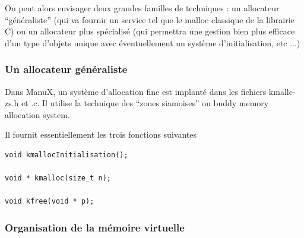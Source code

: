    On peut alors envisager deux grandes familles de techniques : un
allocateur ``généraliste''  (qui va fournir un service tel que le
malloc classique de la librairie C) ou un allocateur plus spécialisé
(qui permettra une gestion bien plus efficace d'un type d'objets
unique avec éventuellement un système d'initialisation, etc ...)

%  
\subsubsection{Un allocateur généraliste}

   Dans ManuX, un système d'allocation fine est implanté dans les
fichiers kmallc-zs.h et .c. Il utilise la technique des ``zones
siamoises'' ou buddy memory allocation system.

   Il fournit essentiellement les trois fonctions suivantes

\begin{lstlisting}
void kmallocInitialisation();

void * kmalloc(size_t n);

void kfree(void * p);
\end{lstlisting}

\subsubsection{Organisation de la mémoire virtuelle}

